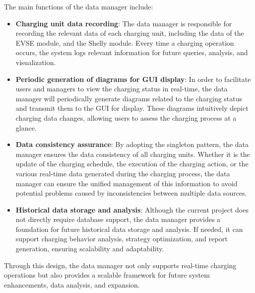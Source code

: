 \documentclass[
	english,
	ruledheaders=section,%
	class=report,%
	thesis={type=Report},%
	accentcolor=9c,%
	custommargins=true,%
	marginpar=false,%
	parskip=half-,%
	fontsize=11pt,%
	logofile={img/tuda_logo.pdf}, %
]{tudapub}
\begin{document}
The main functions of the data manager include:
\begin{itemize}
    \item \textbf{Charging unit data recording}: The data manager is responsible for recording the relevant data of each charging unit, including the data of the EVSE module, and the Shelly module. Every time a charging operation occurs, the system logs relevant information for future queries, analysis, and visualization.
    \item \textbf{Periodic generation of diagrams for \ac{GUI} display}: In order to facilitate users and managers to view the charging status in real-time, the data manager will periodically generate diagrams related to the charging status and transmit them to the \ac{GUI} for display. These diagrams intuitively depict charging data changes, allowing users to assess the charging process at a glance.
    \item \textbf{Data consistency assurance}: By adopting the singleton pattern, the data manager ensures the data consistency of all charging units. Whether it is the update of the charging schedule, the execution of the charging action, or the various real-time data generated during the charging process, the data manager can ensure the unified management of this information to avoid potential problems caused by inconsistencies between multiple data sources.
    \item \textbf{Historical data storage and analysis}: Although the current project does not directly require database support, the data manager provides a foundation for future historical data storage and analysis. If needed, it can support charging behavior analysis, strategy optimization, and report generation, ensuring scalability and adaptability.
\end{itemize}
Through this design, the data manager not only supports real-time charging operations but also provides a scalable framework for future system enhancements, data analysis, and expansion.


\end{document}
